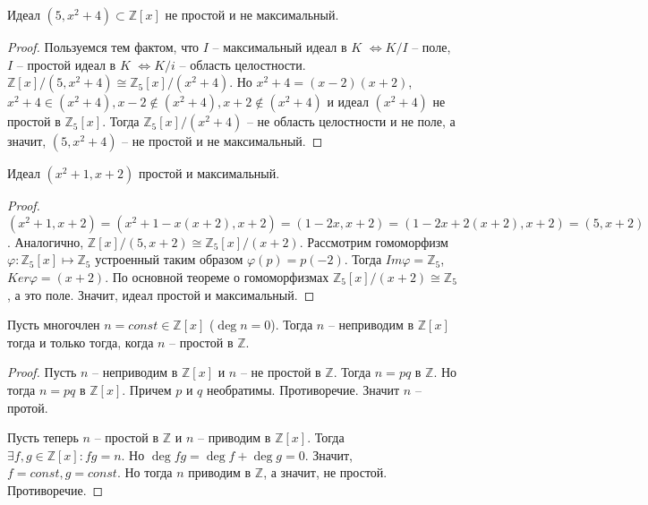 \documentclass{article}
\begin{document}
\begin{statement}
    Идеал $(5, x^2 + 4) \subset \mathbb{Z}[x]$ не простой и не максимальный.
\end{statement}

\begin{proof}
    Пользуемся тем фактом, что $I$ -- максимальный идеал в $K$ $\Leftrightarrow K/I$ -- поле, $I$ -- простой идеал в $K$
    $\Leftrightarrow K/i$ -- область целостности.
    $\mathbb{Z}[x]\Big/(5, x^2 + 4) \cong \mathbb{Z}_5[x]\Big/(x^2 + 4)$. Но $x^2 + 4 = (x - 2)(x + 2)$, $x^2 + 4 \in
    (x^2 + 4), x - 2 \not \in (x^2 + 4), x + 2 \not \in (x^2 + 4)$ и идеал $(x^2+4)$ не простой в $\mathbb{Z}_5[x]$.
    Тогда $\mathbb{Z}_5[x]\Big/(x^2+4)$ -- не область целостности и не поле, а значит, $(5, x^2 + 4)$ -- не простой и не
    максимальный.
\end{proof}

\begin{statement}
    Идеал $(x^2 + 1, x + 2)$ простой и максимальный.
\end{statement}

\begin{proof}
    $(x^2 + 1, x + 2) = (x^2 + 1 - x(x+2), x+2) = (1 - 2x, x + 2) = (1 - 2x + 2(x+2), x+2) = (5, x+2)$. Аналогично,
    $\mathbb{Z}[x]\Big/(5, x+2) \cong \mathbb{Z}_5[x]\Big/(x + 2)$. Рассмотрим гомоморфизм $\varphi: \mathbb{Z}_5[x]
    \mapsto \mathbb{Z}_5$ устроенный таким образом $\varphi(p) = p(-2)$. Тогда $Im \varphi = \mathbb{Z}_5$, $Ker \varphi
    = (x + 2)$. По основной теореме о гомоморфизмах $\mathbb{Z}_5[x]\Big/(x+2) \cong \mathbb{Z}_5$, а это поле. Значит,
    идеал простой и максимальный.
\end{proof}

\begin{statement}
    Пусть многочлен $n = const \in \mathbb{Z}[x]$ ($\deg n = 0$). Тогда $n$ -- неприводим в $\mathbb{Z}[x]$ тогда и
    только тогда, когда $n$ -- простой в $\mathbb{Z}$.
\end{statement}

\begin{proof}
    Пусть $n$ -- неприводим в $\mathbb{Z}[x]$ и $n$ -- не простой в $\mathbb{Z}$. Тогда $n = pq$ в $\mathbb{Z}$. Но
    тогда $n = pq$ в $\mathbb{Z}[x]$. Причем $p$ и $q$ необратимы. Противоречие. Значит $n$ -- протой.

    Пусть теперь $n$ -- простой в $\mathbb{Z}$ и $n$ -- приводим в $\mathbb{Z}[x]$. Тогда $\exists f, g \in
    \mathbb{Z}[x]: fg = n$. Но $\deg fg = \deg f + \deg g = 0$. Значит, $f = const, g = const$. Но тогда $n$ приводим в
    $\mathbb{Z}$, а значит, не простой. Противоречие.
\end{proof}
\end{document}
